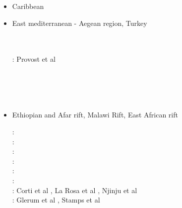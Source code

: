 \begin{itemize}
\item{Caribbean} 
{\scriptsize
\cite{vago10}
\cite{vags13}
\cite{bovt14}\cite{vagw14}\cite{necb14}
\cite{homi15}\cite{necb15}
\cite{phvb20}\cite{mugu20}
}
\item{East mediterranean - Aegean region, Turkey} 
\begin{scriptsize}
\cite{mcke78b}\\
\cite{gabm99}\\
\twothousandthree: Provost et al \cite{prch03}\\
\cite{cazf10}\\
\cite{enlm11}\\
\cite{jofh13}\\
\cite{ozgw17}\\
\cite{rohb20}\cite{femb20}
\end{scriptsize}

\item{Ethiopian and Afar rift, Malawi Rift, East African rift} 

\begin{scriptsize}
\twothousandseven:
\cite{mitk07}\\
\twothousandeight:
\cite{cort08}\\
\twothousandnine:
\cite{kekj09}\\
\twothousandten:
\cite{beve10}\\
\twothousandfourteen:
\cite{phcs14}\cite{sacs14}\\
\twothousandseventeen:
\cite{brcr17} \cite{brcg17}\\
\twothousandnineteen:
Corti et al \cite{cocf19}, La Rosa et al \cite{lapk19}, Njinju et al \cite{njas19}\\
\twothousandtwenty:
Glerum et al \cite{glbs20},
Stamps et al \cite{stkf20}
\end{scriptsize}


\end{itemize}
